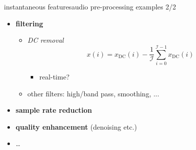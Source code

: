         \begin{frame}{instantaneous features}{audio pre-processing examples 2/2}
            \begin{itemize}
                \item   \textbf{filtering}
                    \begin{itemize}
                        \item   \textit{DC removal}
                            \[
                                x(i) = x_{\mathrm{DC}}(i) - \frac{1}{\mathcal{I}}\sum\limits_{i=0}^{\mathcal{I}-1}{x_{\mathrm{DC}}(i)} 
                            \]
                            \begin{itemize}
                                \item   real-time?
                            \end{itemize}
                        \item   other filters: high/band pass, smoothing, ...
                    \end{itemize}
                \bigskip
                \item<2->   \textbf{sample rate reduction}
                \bigskip
                \item<3->   \textbf{quality enhancement} (denoising etc.)
                \bigskip
                \item<3->   \ldots
            \end{itemize}
        \end{frame}

